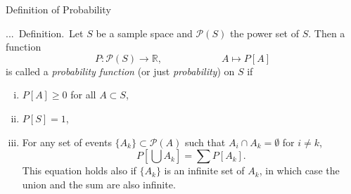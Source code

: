\documentclass[smaller,hyperref={CJKbookmarks=true}]{beamer}
\newcommand{\R}{\mathbb{R}}
\newcounter{zhuo}[subsection]
\renewcommand{\thezhuo}{\thesection.\thesubsection.\arabic{zhuo}}
\newenvironment{DEFINITION}{\stepcounter{zhuo}\alert{\thezhuo.~Definition.\,}}{}
\begin{document}
\begin{frame}[t]{Definition of Probability}
\begin{spacing}{1.05}
\begin{DEFINITION}
Let $S$ be a sample space and $\mathcal{P}(S)$ the power set of $S$. Then a function
\[P:\mathcal{P}(S)\to\R,\qquad\qquad\qquad
A\mapsto P[A]\]
is called a \emph{probability function} (or just \emph{probability}) on $S$ if
\begin{enumerate}[(i)]
  \item $P[A]\geq0$ for all $A\subset S$,
  \item $P[S]=1$,
  \item For any set of events $\{A_k\}\subset\mathcal{P}(A)$ such that $A_i\cap A_k=\emptyset$ for $i\neq k$,
      \[P\left[\bigcup A_k\right]=\sum P[A_k].\]
      This equation holds also if $\{A_k\}$ is an infinite set of $A_k$, in which case the union and the sum are also infinite.
\end{enumerate}
\end{DEFINITION}
\end{spacing}
\end{frame}
\end{document}
